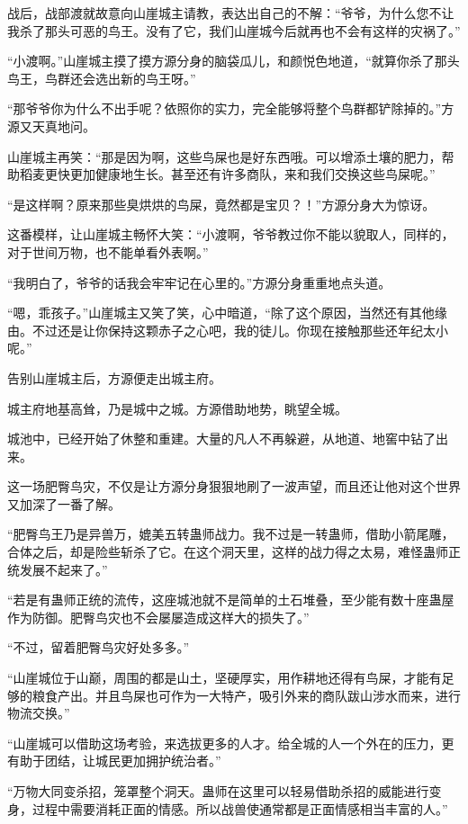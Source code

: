 \begin{this_body}
战后，战部渡就故意向山崖城主请教，表达出自己的不解：“爷爷，为什么您不让我杀了那头可恶的鸟王。没有了它，我们山崖城今后就再也不会有这样的灾祸了。”

“小渡啊。”山崖城主摸了摸方源分身的脑袋瓜儿，和颜悦色地道，“就算你杀了那头鸟王，鸟群还会选出新的鸟王呀。”

“那爷爷你为什么不出手呢？依照你的实力，完全能够将整个鸟群都铲除掉的。”方源又天真地问。

山崖城主再笑：“那是因为啊，这些鸟屎也是好东西哦。可以增添土壤的肥力，帮助稻麦更快更加健康地生长。甚至还有许多商队，来和我们交换这些鸟屎呢。”

“是这样啊？原来那些臭烘烘的鸟屎，竟然都是宝贝？！”方源分身大为惊讶。

这番模样，让山崖城主畅怀大笑：“小渡啊，爷爷教过你不能以貌取人，同样的，对于世间万物，也不能单看外表啊。”

“我明白了，爷爷的话我会牢牢记在心里的。”方源分身重重地点头道。

“嗯，乖孩子。”山崖城主又笑了笑，心中暗道，“除了这个原因，当然还有其他缘由。不过还是让你保持这颗赤子之心吧，我的徒儿。你现在接触那些还年纪太小呢。”

告别山崖城主后，方源便走出城主府。

城主府地基高耸，乃是城中之城。方源借助地势，眺望全城。

城池中，已经开始了休整和重建。大量的凡人不再躲避，从地道、地窖中钻了出来。

这一场肥臀鸟灾，不仅是让方源分身狠狠地刷了一波声望，而且还让他对这个世界又加深了一番了解。

“肥臀鸟王乃是异兽万，媲美五转蛊师战力。我不过是一转蛊师，借助小箭尾雕，合体之后，却是险些斩杀了它。在这个洞天里，这样的战力得之太易，难怪蛊师正统发展不起来了。”

“若是有蛊师正统的流传，这座城池就不是简单的土石堆叠，至少能有数十座蛊屋作为防御。肥臀鸟灾也不会屡屡造成这样大的损失了。”

“不过，留着肥臀鸟灾好处多多。”

“山崖城位于山巅，周围的都是山土，坚硬厚实，用作耕地还得有鸟屎，才能有足够的粮食产出。并且鸟屎也可作为一大特产，吸引外来的商队跋山涉水而来，进行物流交换。”

“山崖城可以借助这场考验，来选拔更多的人才。给全城的人一个外在的压力，更有助于团结，让城民更加拥护统治者。”

“万物大同变杀招，笼罩整个洞天。蛊师在这里可以轻易借助杀招的威能进行变身，过程中需要消耗正面的情感。所以战兽使通常都是正面情感相当丰富的人。”


\end{this_body}

